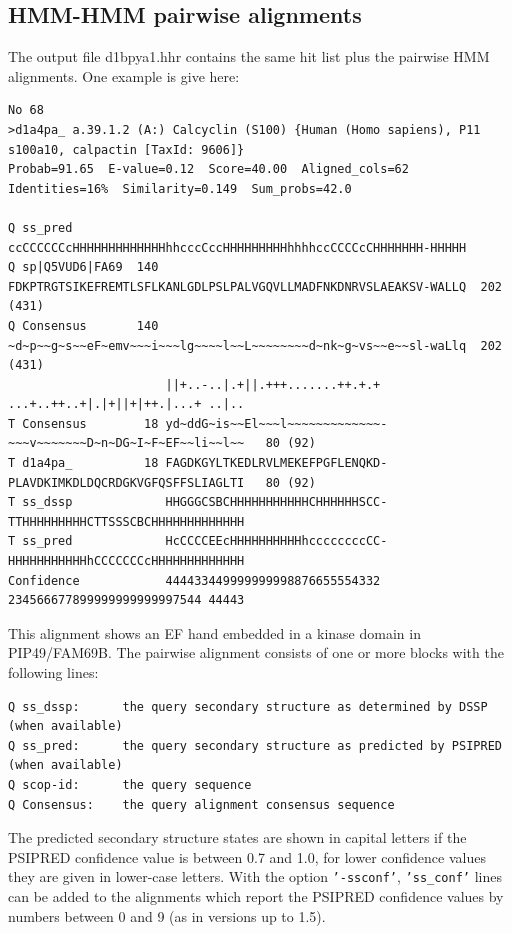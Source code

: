 \documentclass[11pt,a4paper]{article}
\begin{document}
\subsection{HMM-HMM pairwise alignments}

The output file d1bpya1.hhr contains the same hit list plus the pairwise HMM alignments. One example is give here:

\scriptsize
\begin{verbatim}
No 68 
>d1a4pa_ a.39.1.2 (A:) Calcyclin (S100) {Human (Homo sapiens), P11 s100a10, calpactin [TaxId: 9606]}
Probab=91.65  E-value=0.12  Score=40.00  Aligned_cols=62  Identities=16%  Similarity=0.149  Sum_probs=42.0

Q ss_pred             ccCCCCCCcHHHHHHHHHHHHHhhcccCccHHHHHHHHHhhhhccCCCCcCHHHHHHH-HHHHH
Q sp|Q5VUD6|FA69  140 FDKPTRGTSIKEFREMTLSFLKANLGDLPSLPALVGQVLLMADFNKDNRVSLAEAKSV-WALLQ  202 (431)
Q Consensus       140 ~d~p~~g~s~~eF~emv~~~i~~~lg~~~~l~~L~~~~~~~~d~nk~g~vs~~e~~sl-waLlq  202 (431)
                      ||+..-..|.+||.+++.......++.+.+ ...+..++..+|.|+||+|++.|...+ ..|..
T Consensus        18 yd~ddG~is~~El~~~l~~~~~~~~~~~~~-~~~v~~~~~~~D~n~DG~I~F~EF~~li~~l~~   80 (92)
T d1a4pa_          18 FAGDKGYLTKEDLRVLMEKEFPGFLENQKD-PLAVDKIMKDLDQCRDGKVGFQSFFSLIAGLTI   80 (92)
T ss_dssp             HHGGGCSBCHHHHHHHHHHHCHHHHHHSCC-TTHHHHHHHHHCTTSSSCBCHHHHHHHHHHHHH
T ss_pred             HcCCCCEEcHHHHHHHHHHhccccccccCC-HHHHHHHHHHHhCCCCCCCcHHHHHHHHHHHHH
Confidence            444433449999999998876655554332 234566677899999999999997544 44443
\end{verbatim}\normalsize

This alignment shows an EF hand embedded in a kinase domain in PIP49/FAM69B. 
The pairwise alignment consists of one or more blocks with the following lines:

\small
\begin{verbatim}
Q ss_dssp:      the query secondary structure as determined by DSSP (when available)
Q ss_pred:      the query secondary structure as predicted by PSIPRED (when available)
Q scop-id:      the query sequence
Q Consensus:    the query alignment consensus sequence
\end{verbatim}\normalsize

The predicted secondary structure states are shown in capital letters if the PSIPRED
confidence value is between 0.7 and 1.0, for lower confidence values they are given 
in lower-case letters. With the option {\tt '-ssconf'}, {\tt 'ss\_conf'} lines can 
be added to the alignments which report the PSIPRED confidence values by numbers 
between 0 and 9 (as in versions up to 1.5).
\end{document}

